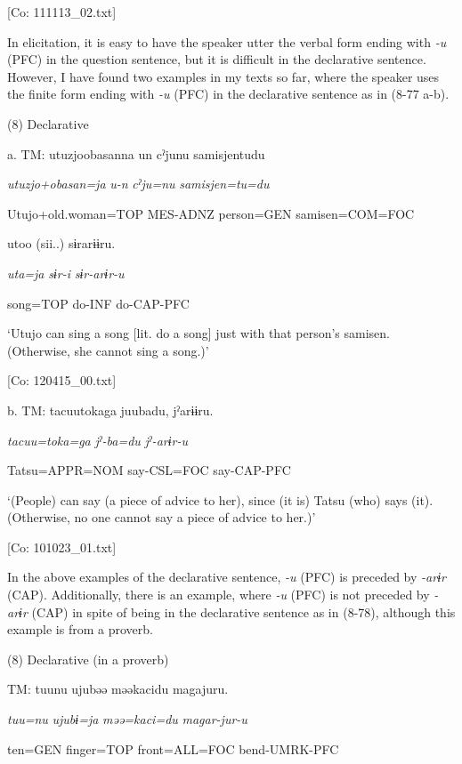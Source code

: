       [Co: 111113\_02.txt]

In elicitation, it is easy to have the speaker utter the verbal form ending with \textit{{}-u} (PFC) in the question sentence, but it is difficult in the declarative sentence. However, I have found two examples in my texts so far, where the speaker uses the finite form ending with \textit{{}-u} (PFC) in the declarative sentence as in (8-77 a-b).

(8)  Declarative

  a.  TM:  utuzjoobasanna  un  cˀjunu  samisjentudu

      \textit{utuzjo+obasan=ja}  \textit{u-n}  \textit{cˀju=nu}  \textit{samisjen=tu=du}

      Utujo+old.woman=TOP  MES-ADNZ  person=GEN  samisen=COM=FOC

      utoo  (sii..)  sɨrarɨɨru.  

      \textit{uta=ja}  \textit{sɨr-i}  \textit{sɨr-arɨr-u}  

      song=TOP  do-INF  do-CAP-PFC  

      ‘Utujo can sing a song [lit. do a song] just with that person’s samisen. (Otherwise, she cannot sing a song.)’

      [Co: 120415\_00.txt]

  b.  TM:  tacuu{\textbar}toka{\textbar}ga  juubadu,  jˀarɨɨru.

      \textit{tacuu=toka=ga}  \textit{jˀ-ba=du}  \textit{jˀ-arɨr-u}

      Tatsu=APPR=NOM  say-CSL=FOC  say-CAP-PFC

      ‘(People) can say (a piece of advice to her), since (it is) Tatsu (who) says (it). (Otherwise, no one cannot say a piece of advice to her.)’

      [Co: 101023\_01.txt]

In the above examples of the declarative sentence, \textit{{}-u} (PFC) is preceded by \textit{-arɨr} (CAP). Additionally, there is an example, where \textit{-u} (PFC) is not preceded by \textit{{}-arɨr} (CAP) in spite of being in the declarative sentence as in (8-78), although this example is from a proverb.

(8)  Declarative (in a proverb)

  TM:  tuunu  ujubəə  məəkacidu  magajuru.

    \textit{tuu=nu}  \textit{ujubɨ=ja}  \textit{məə=kaci=du}  \textit{magar-jur-u}

    ten=GEN  finger=TOP  front=ALL=FOC  bend-UMRK-PFC

